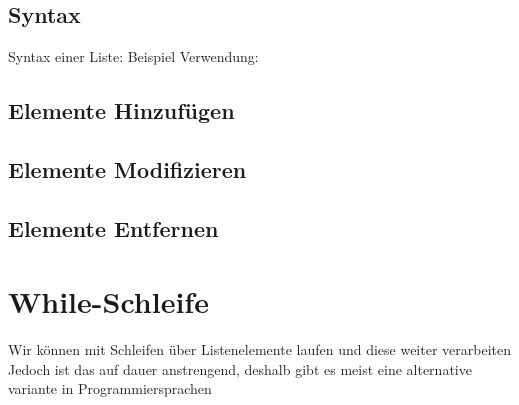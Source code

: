 \subsection{Syntax}
\begin{frame}
    \slidehead
    Syntax einer Liste:
    Beispiel Verwendung:
\end{frame}

\subsection{Elemente Hinzufügen}
\begin{frame}
    \slidehead
\end{frame}

\subsection{Elemente Modifizieren}
\begin{frame}
    \slidehead
\end{frame}

\subsection{Elemente Entfernen}
\begin{frame}
    \slidehead
\end{frame}

\livecoding

\section{While-Schleife}
\subtitle{Schleifen mit Listen}

\begin{frame}[fragile]
    \slidehead
    Wir können mit Schleifen über Listenelemente laufen und diese weiter verarbeiten
    Jedoch ist das auf dauer anstrengend, deshalb gibt es meist eine alternative variante in Programmiersprachen
\end{frame}

